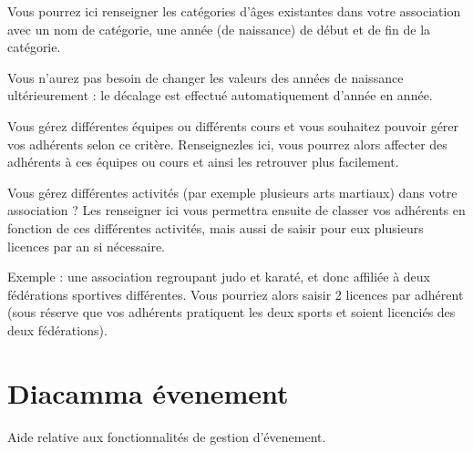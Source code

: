 \documentclass[a4paper,10pt,oneside,french]{sphinxmanual}
\begin{document}

Vous pourrez ici renseigner les catégories d’âges existantes dans votre association avec un nom de catégorie, une année (de naissance) de début et de fin de la catégorie.

Vous n’aurez pas besoin de changer les valeurs des années de naissance ultérieurement : le décalage est effectué automatiquement d’année en année.
\begin{quote}

\noindent{}
\end{quote}


Vous gérez différentes équipes ou différents cours et vous souhaitez pouvoir gérer vos adhérents selon ce critère.
Renseignez\sphinxhyphen{}les ici, vous pourrez alors affecter des adhérents à ces équipes ou cours et ainsi les retrouver plus facilement.
\begin{quote}

\noindent{}
\end{quote}


Vous gérez différentes activités (par exemple plusieurs arts martiaux) dans votre association ? Les renseigner ici vous permettra ensuite de classer vos adhérents en fonction de ces différentes activités, mais aussi de saisir pour eux plusieurs licences par an si nécessaire.

Exemple : une association regroupant judo et karaté, et donc affiliée à deux fédérations sportives différentes.
Vous pourriez alors saisir 2 licences par adhérent (sous réserve que vos adhérents pratiquent les deux sports et soient licenciés des deux fédérations).
\begin{quote}

\noindent{}
\end{quote}


\chapter{Diacamma évenement}
\label{\detokenize{event/index:diacamma-evenement}}\label{\detokenize{event/index::doc}}
Aide relative aux fonctionnalités de gestion d’évenement.
\end{document}
